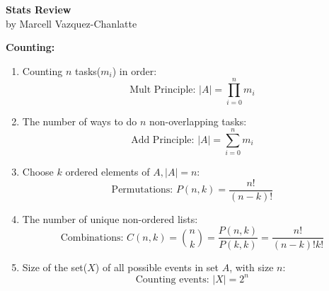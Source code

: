\documentclass[12pt]{article}
\newcommand{\abs}[1]{\left| #1 \right|} %
\renewcommand{\=}[1]{\stackrel{#1}{=}} %
\theoremstyle{definition}
\theoremstyle{remark}
\begin{document}
\begin{center}
  {\LARGE
    \textbf{Stats Review}\\
    \normalsize
    \textnormal {by Marcell Vazquez-Chanlatte}
    \\[1ex]}

  
\end{center}

\textbf{Counting:}
\begin{enumerate}
\item Counting $n$ tasks($m_i$) in order:
  \begin{equation}
    \textrm{Mult Principle:  } \abs{A}= \displaystyle\prod_{i = 0}^{n}m_i
  \end{equation}
\item The number of ways to do $n$ non-overlapping tasks:
  \begin{equation}
    \textrm{Add Principle: } \abs{A} = \sum_{i=0}^n m_i
  \end{equation}
\item Choose $k$ ordered elements of $A, \abs{A}=
  n$:
  \begin{equation}
    \textrm{Permutations: } P(n,k) = \frac{n!}{(n-k)!} 
  \end{equation}
\item The number of unique non-ordered lists:
  \begin{equation}
    \textrm{Combinations: } C(n,k) = \binom{n}{k} = \frac{P(n,k)}{P(k,k)} =
    \frac{n!}{(n-k)!k!}
  \end{equation}
\item Size of the set($X$) of all possible events in set
  $A$, with size $n$:
  \begin{equation}
    \textrm{Counting events: } \abs{X} = 2^n
  \end{equation}
\end{enumerate}
\end{document}
